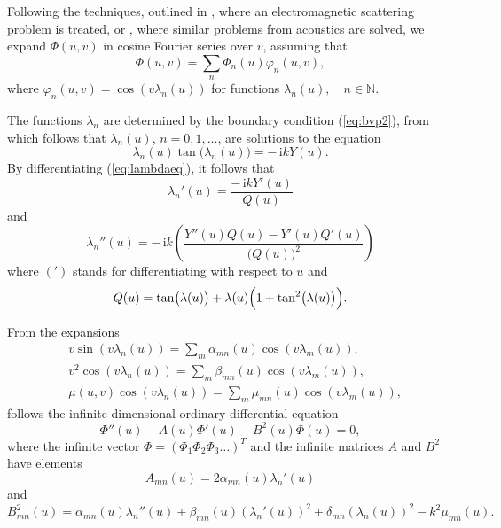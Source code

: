 \documentclass[numreferences]{kluwer}
\renewcommand{\phi}{\varphi}
\renewcommand{\Phi}{\varPhi}
\renewcommand{\vec}[1]{\bm{#1}}
\renewcommand{\i}{\,\mathrm{i}}
\renewcommand{\Phi}{\varPhi}
\begin{document}
Following the techniques, outlined in \cite{Andersson-Nilsson:2009},
where an electromagnetic scattering problem is treated, or
\cite{Nilsson:2002}, where similar problems from acoustics are solved,
we expand $\Phi(u,v)$ in cosine Fourier series over $v$, assuming that
\begin{equation}
  \label{eq:fcosseries}
  \Phi(u,v)=\sum_n\Phi_n(u)\phi_n(u,v),
\end{equation}
where $\phi_n(u,v)=\cos(v\lambda_n(u))$ for functions
$\lambda_n(u),\quad n\in\mathbb N$.

The functions $\lambda_n$ are determined by the boundary condition
(\ref{eq:bvp2}), from which follows that $\lambda_n(u)$,
$n=0,1,\dots$, are solutions to the equation
\begin{equation}
  \label{eq:lambdaeq}
  \lambda_n(u)\tan\bigl(\lambda_n(u)\bigr)=-\i kY(u).
\end{equation}
By differentiating (\ref{eq:lambdaeq}), it follows that
\begin{equation}
  \label{eq:lambdaprim}
  \lambda_n'(u)=
  \frac{-\i kY'(u)}{Q(u)}
\end{equation}
and
\begin{equation}
  \label{eq:lambdabis}
  \lambda_n''(u)=-\i k\left(\frac{Y''(u)Q(u)-Y'(u)Q'(u)}
    {\bigl(Q(u)\bigr)^2}\right)
\end{equation}
where $(')$ stands for differentiating with respect to $u$ and
\begin{equation*}
  Q(u)=\tan\bigl(\lambda(u)\bigr)+
  \lambda(u)\Bigl(1+\tan^2\bigl(\lambda(u)\bigr)\Bigr).
\end{equation*}

From the expansions
\begin{align}
  \label{eq:vsinlambda}
  &v\sin(v\lambda_n(u))=\sum_m\alpha_{mn}(u)\cos(v\lambda_m(u)),\\
  \label{eq:vcos^2lambda}
  &v^2\cos(v\lambda_n(u))=\sum_m\beta_{mn}(u)\cos(v\lambda_m(u)),\\
  \label{eq:mucoslambda}
  &\mu(u,v)\cos(v\lambda_n(u))=\sum_m\mu_{mn}(u)\cos(v\lambda_m(u)),
\end{align}
follows the infinite-dimensional ordinary differential equation
\begin{equation}
  \label{eq:DE}
  \vec\Phi''(u)-A(u)\vec\Phi'(u)-B^2(u)\vec\Phi(u)=0,
\end{equation}
where the infinite vector $\vec\Phi=(\Phi_1 \Phi_2 \Phi_3\dots)^T$ and
the infinite matrices $A$ and $B^2$ have elements
\begin{equation}
  \label{eq:A}
  A_{mn}(u)=2\alpha_{mn}(u)\lambda_n'(u)
\end{equation}
and
\begin{equation}
  \label{eq:B2}
  B^2_{mn}(u)=\alpha_{mn}(u)\lambda_n''(u)
  +\beta_{mn}(u)\left(\lambda_n'(u)\right)^2
  +\delta_{mn}\left(\lambda_n(u)\right)^2
  -k^2\mu_{mn}(u).
\end{equation}
\end{document}
